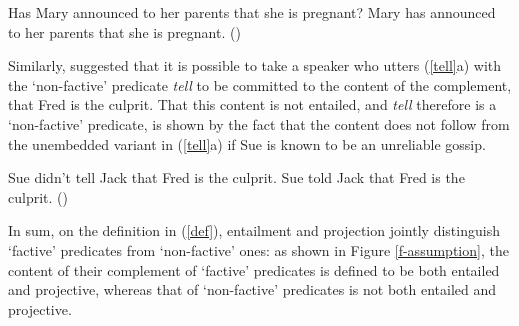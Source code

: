 \documentclass[11pt,fleqn]{article}
\newcommand{\6}{\mbox{$[\hspace*{-.6mm}[$}}
\newcommand{\9}{\mbox{$]\hspace*{-.6mm}]$}}
\begin{document}
\begin{exe}
\ex\label{announce2} 
\begin{xlist}
\ex Has Mary announced to her parents that she is pregnant? 
\ex Mary has announced to her parents that she is pregnant. \hfill (\citealt[139]{schlenker10})
\end{xlist}
\end{exe}
Similarly, \citet{spector-egre2015} suggested that it is possible to take a speaker who utters (\ref{tell}a) with the `non-factive' predicate {\em tell}  to be committed to the content of the complement, that Fred is the culprit. That this content is not entailed, and {\em tell} therefore is a `non-factive' predicate, is shown by the fact that the content does not follow from the unembedded variant in (\ref{tell}a) if Sue is known to be an unreliable gossip.

\begin{exe}
\ex\label{tell}
\begin{xlist}
\ex Sue didn't tell Jack that Fred is the culprit. 
\ex Sue told Jack that Fred is the culprit. \hfill (\citealt[1739]{spector-egre2015})
\end{xlist}
\end{exe}

In sum, on the definition in (\ref{def}), entailment and projection jointly distinguish `factive' predicates from `non-factive' ones: as shown in Figure \ref{f-assumption}, the content of their complement of `factive' predicates is defined to be both entailed and projective, whereas that of `non-factive' predicates is not both entailed and projective. 
\end{document}
